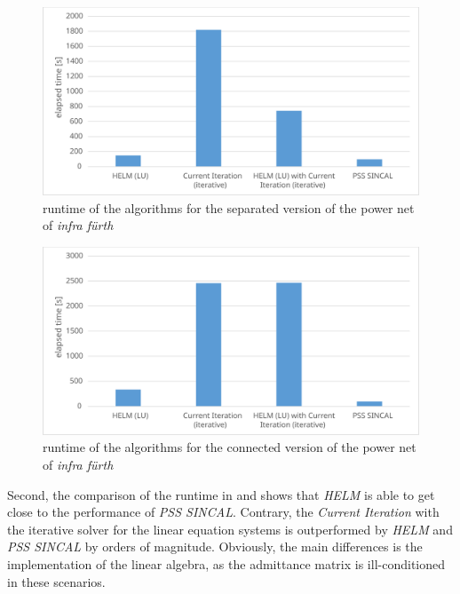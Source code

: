 \begin{figure}
	\centering
	\includegraphics[scale=0.7]{figures/big_net_separate_runtime}
	\caption[Comparison, \emph{infra fürth}, separate, runtime]{runtime of the algorithms for the separated version of the power net of \emph{infra fürth}}
	\label{fig:big_net_separate_runtime}
\end{figure}

\begin{figure}
	\centering
	\includegraphics[scale=0.7]{figures/big_net_combined_runtime}
	\caption[Comparison, \emph{infra fürth}, connected, runtime]{runtime of the algorithms for the connected version of the power net of \emph{infra fürth}}
	\label{fig:big_net_combined_runtime}
\end{figure}

Second, the comparison of the runtime in  and  shows that \emph{HELM} is able to get close to the performance of \emph{PSS SINCAL}. Contrary, the \emph{Current Iteration} with the iterative solver for the linear equation systems is outperformed by \emph{HELM} and \emph{PSS SINCAL} by orders of magnitude. Obviously, the main differences is the implementation of the linear algebra, as the admittance matrix is ill-conditioned in these scenarios.

